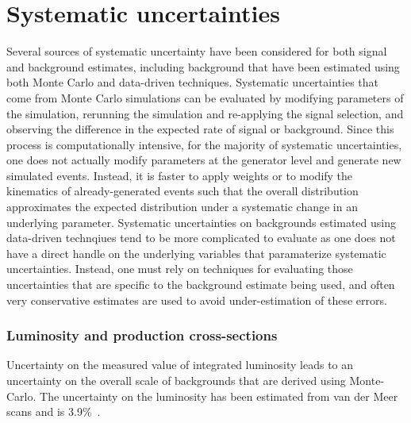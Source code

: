 
\section{Systematic uncertainties}\label{sect:syst}
Several sources of systematic uncertainty have been considered for both signal and background estimates,
including background that have been estimated using both Monte Carlo and data-driven techniques.
Systematic uncertainties that come from Monte Carlo simulations can be evaluated by modifying parameters of the simulation,
rerunning the simulation and re-applying the signal selection, and observing the difference in the expected rate of signal or background.
Since this process is computationally intensive, for the majority of systematic uncertainties,
one does not actually modify parameters at the generator level and generate new simulated events.
Instead, it is faster to apply weights or to modify the kinematics of already-generated events
such that the overall distribution approximates the  expected distribution under a systematic change
in an underlying parameter.
Systematic uncertainties on backgrounds estimated using data-driven technqiues tend to be more complicated to evaluate
as one does not have a direct handle on the underlying variables that paramaterize systematic uncertainties.
Instead, one must rely on techniques for evaluating those uncertainties that are specific to the background estimate being used, 
and often very conservative estimates are used to avoid under-estimation of these errors.


\subsubsection{Luminosity and production cross-sections}
Uncertainty on the measured value of integrated luminosity leads to an uncertainty on the overall scale of backgrounds that are derived using Monte-Carlo.
The uncertainty on the luminosity has been estimated from van der Meer scans and is 3.9\%~\cite{Aad:2011dr,ATLAS-CONF-2011-116}. 

